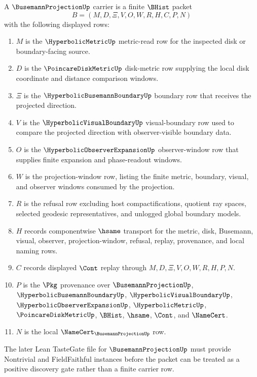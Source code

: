 \begin{definition}
\label{def:busemann-projection-carrier}
A $\BusemannProjectionUp$ carrier is a finite $\BHist$ packet
$$
B=(M,D,\Xi,V,O,W,R,H,C,P,N)
$$
with the following displayed rows:
\begin{enumerate}
\item $M$ is the $\HyperbolicMetricUp$ metric-read row for the inspected disk or boundary-facing source.
\item $D$ is the $\PoincareDiskMetricUp$ disk-metric row supplying the local disk coordinate and distance comparison windows.
\item $\Xi$ is the $\HyperbolicBusemannBoundaryUp$ boundary row that receives the projected direction.
\item $V$ is the $\HyperbolicVisualBoundaryUp$ visual-boundary row used to compare the projected direction with observer-visible boundary data.
\item $O$ is the $\HyperbolicObserverExpansionUp$ observer-window row that supplies finite expansion and phase-readout windows.
\item $W$ is the projection-window row, listing the finite metric, boundary, visual, and observer windows consumed by the projection.
\item $R$ is the refusal row excluding host compactifications, quotient ray spaces, selected geodesic representatives, and unlogged global boundary models.
\item $H$ records componentwise $\hsame$ transport for the metric, disk, Busemann, visual, observer, projection-window, refusal, replay, provenance, and local naming rows.
\item $C$ records displayed $\Cont$ replay through $M,D,\Xi,V,O,W,R,H,P,N$.
\item $P$ is the $\Pkg$ provenance over $\BusemannProjectionUp$, $\HyperbolicBusemannBoundaryUp$, $\HyperbolicVisualBoundaryUp$, $\HyperbolicObserverExpansionUp$, $\HyperbolicMetricUp$, $\PoincareDiskMetricUp$, $\BHist$, $\hsame$, $\Cont$, and $\NameCert$.
\item $N$ is the local $\NameCert_{\BusemannProjectionUp}$ row.
\end{enumerate}
The later Lean TasteGate file for $\BusemannProjectionUp$ must provide Nontrivial and FieldFaithful instances before the packet can be treated as a positive discovery gate rather than a finite carrier row.
\end{definition}

